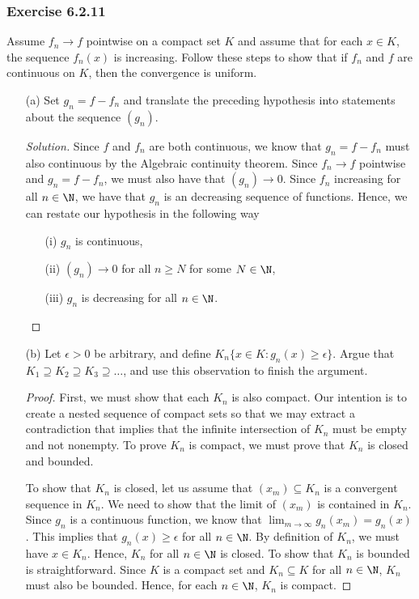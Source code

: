 \subsubsection{Exercise 6.2.11} Assume \( f_n \to f  \) pointwise on a compact set \( K  \) and assume that for each \( x \in K  \), the sequence \( f_n(x)  \) is increasing. Follow these steps to show that if \( f_n  \) and \( f  \) are continuous on \( K  \), then the convergence is uniform.

\begin{enumerate}
    \item[(a)] Set \( g_n = f - f_n  \) and translate the preceding hypothesis into statements about the sequence \( (g_n)  \).
        \begin{proof}[Solution]
        Since \( f  \) and \( f_n  \) are both continuous, we know that \( g_n = f - f_n \) must also continuous by the Algebraic continuity theorem. Since \( f_n \to f  \) pointwise and \( g_n = f - f_n \), we must also have that \( (g_n) \to 0  \). Since \( f_n  \) increasing for all \( n \in \N  \), we have that \( g_n  \) is an decreasing sequence of functions. Hence, we can restate our hypothesis in the following way
        \begin{enumerate}
            \item[(i)] \( g_n \) is continuous,
            \item[(ii)] \( (g_n) \to 0  \) for all \( n \geq N  \) for some \( N \in \N  \),
            \item[(iii)] \( g_n \) is decreasing for all \(  n \in \N  \).
        \end{enumerate}
        \end{proof}
    \item[(b)] Let \( \epsilon > 0  \) be arbitrary, and define \( K_n \{ x \in K : g_n(x) \geq \epsilon  \}  \). Argue that \( K_1 \supseteq K_2 \supseteq K_3 \supseteq \dots  \), and use this observation to finish the argument.
        \begin{proof}
        First, we must show that each \( K_n  \) is also compact. Our intention is to create a nested sequence of compact sets so that we may extract a contradiction that implies that the infinite intersection of \( K_n  \) must be empty and not nonempty. To prove \( K_n  \) is compact, we must prove that \( K_n   \) is closed and bounded.

        To show that \( K_n \) is closed, let us assume that \( (x_m) \subseteq K_n  \) is a convergent sequence in \( K_n \). We need to show that the limit of \( (x_m)  \) is contained in \( K_n \). Since \( g_n \) is a continuous function, we know that \( \lim_{ m \to \infty  } g_n(x_m) = g_n(x)  \). This implies that \( g_n(x) \geq \epsilon  \) for all \( n \in \N \). By definition of \( K_n \), we must have \( x \in K_n \). Hence, \( K_n  \) for all \( n \in \N  \) is closed.
        To show that \( K_n  \) is bounded is straightforward. Since \( K  \) is a compact set and \( K_n \subseteq K  \) for all \( n \in \N  \), \( K_n  \) must also be bounded. Hence, for each \( n \in \N  \), \(  K_n  \) is compact.


\end{proof}
\end{enumerate}
